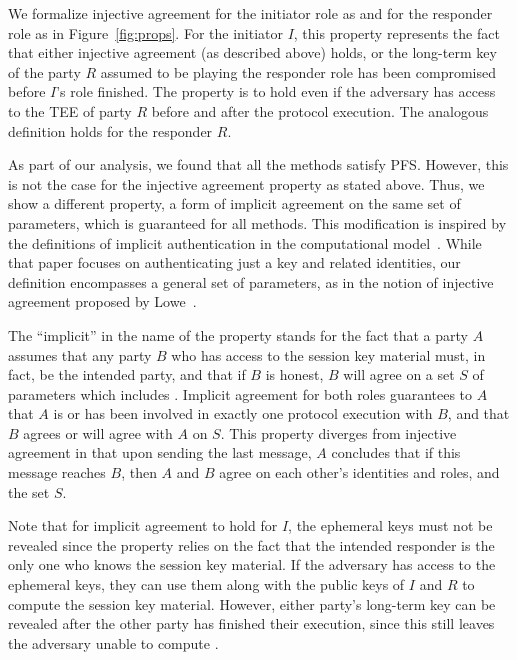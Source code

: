%
We formalize injective agreement for the initiator role as \mPredInjI{} and
for the responder role as \mPredInjR{} in Figure~\ref{fig:props}.
%
For the initiator $I$, this property represents the fact that either
injective agreement (as described above) holds, or the long-term key of
the party $R$ assumed to be playing the responder role has been
compromised before $I$'s role finished.
%
The property is to hold even if the adversary has access to the TEE of party $R$
before and after the protocol execution.
%
The analogous definition holds for the responder $R$.
%

As part of our analysis, we found that all the \mEdhoc{} methods satisfy PFS.
%
However, this is not the case for the injective agreement property as stated above.
%
Thus, we show a different property, a form of implicit agreement on the same
set of parameters, which is guaranteed for all methods.
%
This modification is inspired by the definitions of implicit authentication in
the computational model~\cite{DBLP:conf/csfw/GuilhemFW20}.
%
While that paper focuses on authenticating just a key and related identities,
our definition encompasses a general set of parameters, as in the notion of
injective agreement proposed by Lowe~\cite{DBLP:conf/csfw/Lowe97a}.

The ``implicit'' in the name of the property stands for the fact that a party
$A$ assumes that any party $B$ who has access to the session key material
\mSessKey{} must, in fact, be the intended party, and that if $B$ is honest,
$B$ will agree on a set $S$ of parameters which includes \mSessKey.
%
Implicit agreement for both roles guarantees to $A$ that $A$ is or has been
involved in exactly one protocol execution with $B$, and that $B$ agrees or
will agree with $A$ on $S$.
%
This property diverges from injective agreement in that upon sending
the last message, $A$ concludes that if this message reaches $B$, then $A$
and $B$ agree on each other's identities and roles, and the set $S$.
%

Note that for implicit agreement to hold for $I$, the ephemeral keys must not
be revealed since the property relies on the fact that the intended responder
is the only one who knows the session key material.
%
If the adversary has access to the ephemeral keys, they can use them along with
the public keys of $I$ and $R$ to compute the session key material.
%
However, either party's long-term key can be revealed after the other
party has finished their execution, since this still leaves the adversary
unable to compute \mGxy{}.
%

